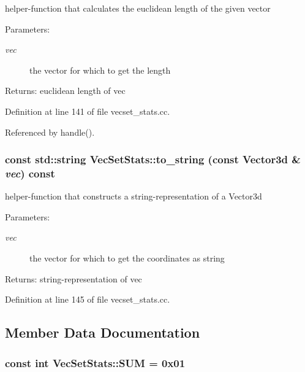 helper-function that calculates the euclidean length of the given vector \begin{Desc}
\item[Parameters:]
\begin{description}
\item[{\em vec}]the vector for which to get the length \end{description}
\end{Desc}
\begin{Desc}
\item[Returns:]euclidean length of vec \end{Desc}


Definition at line 141 of file vecset\_\-stats.cc.

Referenced by handle().\hypertarget{class_vec_set_stats_65b3c5457a2fe6b5fa784263356ab8ac}{
\subsubsection[to\_\-string]{\setlength{\rightskip}{0pt plus 5cm}const std::string VecSetStats::to\_\-string (const Vector3d \& {\em vec}) const}}
\label{class_vec_set_stats_65b3c5457a2fe6b5fa784263356ab8ac}


helper-function that constructs a string-representation of a Vector3d \begin{Desc}
\item[Parameters:]
\begin{description}
\item[{\em vec}]the vector for which to get the coordinates as string \end{description}
\end{Desc}
\begin{Desc}
\item[Returns:]string-representation of vec \end{Desc}


Definition at line 145 of file vecset\_\-stats.cc.

\subsection{Member Data Documentation}
\hypertarget{class_vec_set_stats_d40b4c031735e61869d380bec761041a}{
\subsubsection[SUM]{\setlength{\rightskip}{0pt plus 5cm}const int {\bf VecSetStats::SUM} = 0x01}}
\label{class_vec_set_stats_d40b4c031735e61869d380bec761041a}


